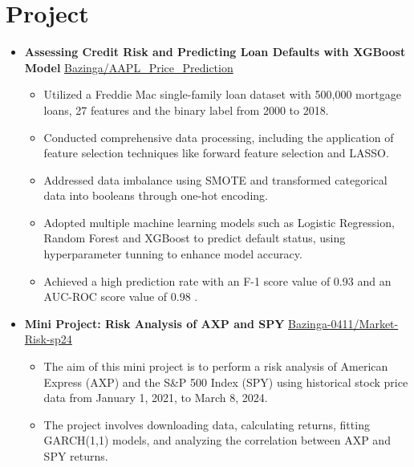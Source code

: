 \documentclass{resume}
\newcommand{\en}[1]{#1}
\newcommand{\zh}[1]{}
\begin{document}
\section{\en{Project}\zh{项目}}
\begin{itemize}[parsep=0.25ex]
      \item \textbf{Assessing Credit Risk and Predicting Loan Defaults with XGBoost Model } \href{https://github.com/Bazinga-0411/AAPL_Price_Prediction/}{Bazinga/AAPL\_Price\_Prediction}
           
            \begin{itemize}
                  \item Utilized a Freddie Mac single-family loan dataset with 500,000 mortgage loans, 27 features and the binary label from 2000 to 2018.

                 \item Conducted comprehensive data processing, including the application of feature selection techniques like forward feature selection and LASSO.
                  
                 \item Addressed data imbalance using SMOTE and transformed categorical data into booleans through one-hot encoding.
                  
                 \item Adopted multiple machine learning models such as Logistic Regression, Random Forest and XGBoost to predict default status, using hyperparameter tunning to enhance model accuracy.
                  
                 \item Achieved a high prediction rate with an F-1 score value of 0.93 and an AUC-ROC score value of 0.98 .

            \end{itemize}
            \item \en{\textbf{Mini Project: Risk Analysis of AXP and SPY }\href{https://github.com/Bazinga-0411/Market-Risk-sp24}{Bazinga-0411/Market-Risk-sp24}}           
            \begin{itemize}
            \item The aim of this mini project is to perform a risk analysis of American Express (AXP) and the S\&P 500 Index (SPY) using historical stock price data from January 1, 2021, to March 8, 2024.
            \item The project involves downloading data, calculating returns, fitting GARCH(1,1) models, and analyzing the correlation between AXP and SPY returns.
            \end{itemize}


\end{itemize}
\end{document}
